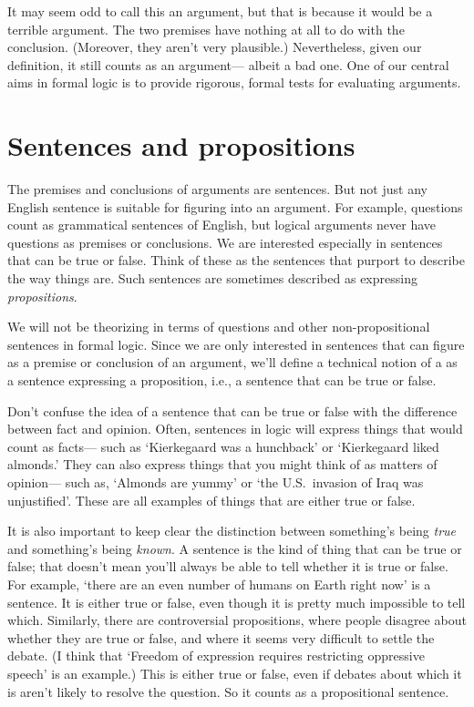It may seem odd to call this an argument, but that is because it would be a {terrible} argument. The two premises have nothing at all to do with the conclusion. (Moreover, they aren't very plausible.) Nevertheless, given our definition, it still counts as an argument--- albeit a bad one. One of our central aims in formal logic is to provide rigorous, formal tests for evaluating arguments.


\section{Sentences and propositions}
\label{intro.sentences}

The premises and conclusions of arguments are sentences. But not just any English sentence is suitable for figuring into an argument. For example, questions count as grammatical sentences of English, but logical arguments never have questions as premises or conclusions. We are interested especially in sentences that can be true or false. Think of these as the sentences that purport to describe the way things are. Such sentences are sometimes described as expressing \emph{propositions}.

We will not be theorizing in terms of questions and other non-propositional sentences in formal logic. Since we are only interested in sentences that can figure as a premise or conclusion of an argument, we'll define a technical notion of a  as a sentence expressing a proposition, i.e., a sentence that can be true or false.

Don't confuse the idea of a sentence that can be true or false with the difference between fact and opinion. Often, sentences in logic will express things that would count as facts--- such as `Kierkegaard was a hunchback' or `Kierkegaard liked almonds.' They can also express things that you might think of as matters of opinion--- such as, `Almonds are yummy' or `the U.S.\ invasion of Iraq was unjustified'. These are all examples of things that are either true or false.

It is also important to keep clear the distinction between something's being \emph{true} and something's being \emph{known}. A sentence is the kind of thing that can be true or false; that doesn't mean you'll always be able to tell whether it is true or false. For example, `there are an even number of humans on Earth right now' is a sentence. It is either true or false, even though it is pretty much impossible to tell which. Similarly, there are controversial propositions, where people disagree about whether they are true or false, and where it seems very difficult to settle the debate. (I think that `Freedom of expression requires restricting oppressive speech' is an example.) This is either true or false, even if debates about which it is aren't likely to resolve the question. So it counts as a propositional sentence.

